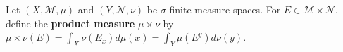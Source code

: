 Let $(X, \mathcal{M}, \mu)$ and $(Y, \mathcal{N}, \nu)$ be $\sigma$-finite measure spaces. For $E \in \mathcal{M} \times \mathcal{N}$, define the \textbf{product measure} $\mu \times \nu$ by $\mu \times \nu(E) = \int_X \nu(E_x) d\mu(x) = \int_Y \mu(E^y) d\nu(y)$.
